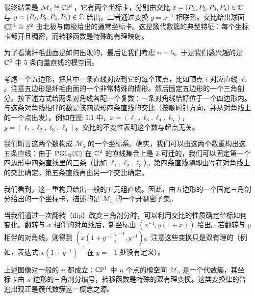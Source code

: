 最终结果是 $\mathcal{M}_4\cong\mathbb{C}\mathbb{P}^1$，它有两个坐标卡，分别由交比 $x=(P_1,P_2,P_3,P_4)\in\mathbb{C}$ 与 $y=(P_2,P_3,P_4,P_1)\in\mathbb{C}$ 给出，二者通过变换 $y=x^{-1}$ 相联系。交比给出球面 $\mathbb{C}\mathbb{P}^1\cong S^2$ 由北极与南极给出的通常坐标卡。这是簇代数簇的典型特征：每个坐标卡都开且稠密，而转移函数是特殊的有理映射。

为了看清纤毛曲面是如何出现的，最后让我们考虑 $n=5$。于是我们感兴趣的是 $\mathbb{C}^2$ 中 5 条向量直线的模空间。

考虑一个五边形，把其中一条直线对应到它的每个顶点，比如顶点 $i$ 对应直线 $\ell_i$。注意五边形是纤毛曲面的一个非常特殊的情形。然后固定五边形的一个三角剖分。按下述方式给两条对角线各配一个复数：一条对角线恰好位于一个四边形内。与这条对角线相伴的数是该四边形四条直线的交比（按顺时针方向，并从对角线上的一个点出发）。例如在图 5.1 中，$x=(\ell_1,\ell_3,\ell_4,\ell_5)$，$y=(\ell_1,\ell_2,\ell_3,\ell_4)$。交比的不变性表明这个数与起点无关。

我们断言这两个数构成 $\mathcal{M}_5$ 的一个坐标系。确实，我们可以由这两个数重构出这五条直线：由于 $\operatorname{PGL}_2(\mathbb{C})$ 在 $\mathbb{C}^2$ 的直线集合上是 3-可迁的，我们可以固定第一个四边形中四条直线里的三条（比如 $\ell_1,\ell_2,\ell_3$）。第四条直线随即由写在对角线上的交比确定。第五条直线再由另一个交比确定。

我们看到，这一重构只给出一般的五元组直线。因此，由五边形的一个固定三角剖分给出的一个坐标卡，描述的是 $\mathcal{M}_5$ 的一个开稠密子集。


当我们通过一次翻转（flip）改变三角剖分时，可以利用交比的性质确定坐标如何变化。翻转与 $x$ 相伴的对角线后，新坐标由 $(x^{-1},y(1+x))$ 给出。若翻转与 $y$ 相伴的对角线，则得到 $(x(1+y^{-1})^{-1},y^{-1})$。注意这些变换只是双有理的（例如，表达式 $x(1+y^{-1})^{-1}$ 在 $y=-1$ 处没有定义）。

上述图像对一般的 $n$ 都成立：$\mathbb{C}\mathbb{P}^1$ 中 $n$ 个点的模空间 $\mathcal{M}_n$ 是一个代数簇，其坐标卡由 $n$ 边形的三角剖分编号，转移函数是特殊的双有理变换。这类变换律的普遍出现正是簇代数簇这一概念之源。

